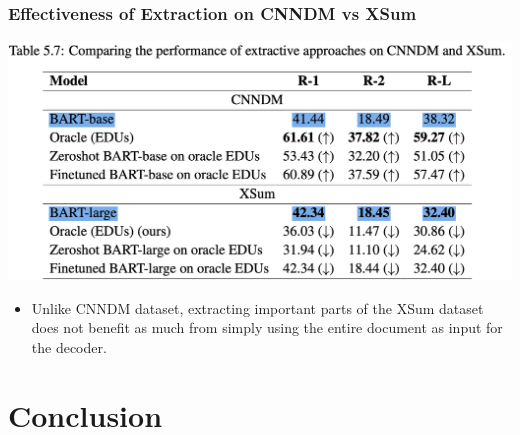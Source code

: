 \documentclass{beamer}
\begin{document}
\begin{frame}
\frametitle{Effectiveness of Extraction on CNNDM vs XSum}

   \begin{minipage}[t][0.5\textheight][t]{\textwidth}
      \centering
      \includegraphics[width=\textwidth]{imgs/table57_highlight.png} 
  \end{minipage}

  \vfill

  \begin{minipage}[t][0.3\textheight][t]{\textwidth}
    \begin{itemize}
      \item Unlike CNNDM dataset, extracting important parts of the XSum dataset does not benefit as much from simply using the entire document as input for the decoder.
    \end{itemize}
  \end{minipage}
 
\end{frame}


\section{Conclusion}
\end{document}
